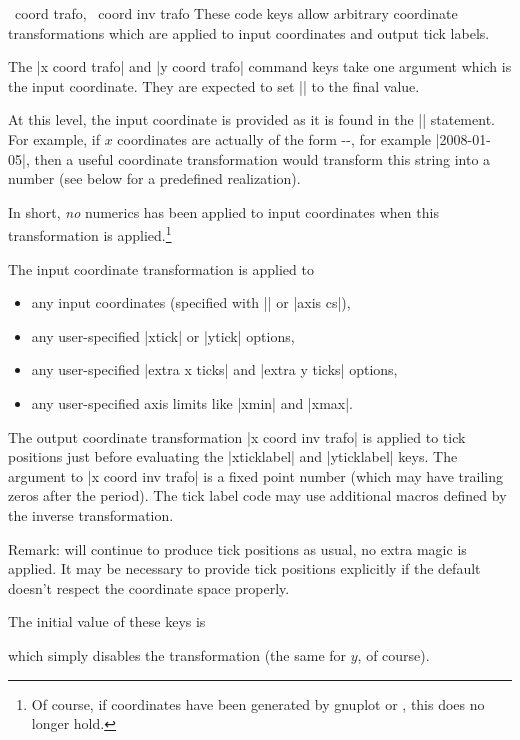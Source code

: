 \begin{pgfplotsxycodekeylist}{%
    \x\ coord trafo,
    \x\ coord inv trafo%
}
    These code keys allow arbitrary coordinate transformations which are
    applied to input coordinates and output tick labels.

    The |x coord trafo| and |y coord trafo| command keys take one argument
    which is the input coordinate. They are expected to set |\pgfmathresult| to
    the final value.

    At this level, the input coordinate is provided as it is found in the
    |\addplot| statement. For example, if $x$ coordinates are actually of the
    form --, for example |2008-01-05|, then a
    useful coordinate transformation would transform this string into a number
    (see below for a predefined realization).

    In short, \emph{no} numerics has been applied to input coordinates when
    this transformation is applied.\footnote{Of course, if coordinates have been
    generated by gnuplot or \pgfname{}, this does no longer hold.}

    The input coordinate transformation is applied to
    \begin{itemize}
        \item any input coordinates (specified with |\addplot| or |axis cs|),
        \item any user-specified |xtick| or |ytick| options,
        \item any user-specified |extra x ticks| and |extra y ticks| options,
        \item any user-specified axis limits like |xmin| and |xmax|.
    \end{itemize}

    The output coordinate transformation |x coord inv trafo| is applied to tick
    positions just before evaluating the |xticklabel| and |yticklabel| keys.
    The argument to |x coord inv trafo| is a fixed point number (which may have
    trailing zeros after the period). The tick label code may use additional
    macros defined by the inverse transformation.

    Remark: \PGFPlots{} will continue to produce tick positions as usual, no
    extra magic is applied. It may be necessary to provide tick positions
    explicitly if the default doesn't respect the coordinate space properly.

    The initial value of these keys is
\begin{codeexample}
\end{codeexample}
    \noindent which simply disables the transformation (the same for $y$, of
    course).



\end{pgfplotsxycodekeylist}
